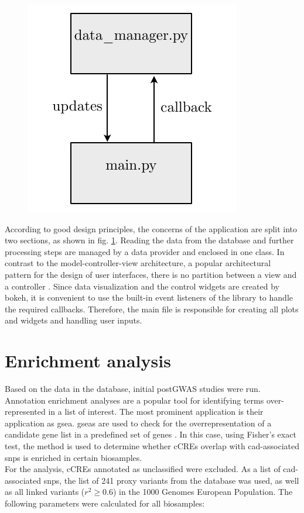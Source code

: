     \begin{figure}[h]
    \capstart
        \centering
    	\includegraphics{Abbildung/vis_architecture.pdf}

    	\begin{minipage}{\captionwidth}
    		\caption[vis archi]{}
    		\label{fig:plot_architecture}
    	\end{minipage}
    \end{figure}

According to good design principles, the concerns of the application are split into two sections, as shown in fig. \ref{fig:plot_architecture}. Reading the data from the database and further processing steps are managed by a data provider and enclosed in one class. In contrast to the model-controller-view architecture, a popular architectural pattern for the design of user interfaces, there is no partition between a view and a controller \cite{langtangenUsingWebFrameworks2015}. Since data visualization and the control widgets are created by bokeh, it is convenient to use the built-in event listeners of the library to handle the required callbacks. Therefore, the main file is responsible for creating all plots and widgets and handling user inputs.

\section{Enrichment analysis}
\label{sec:enrichment}
Based on the data in the database, initial postGWAS studies were run. Annotation enrichment analyses are a popular tool for identifying terms over-represented in a list of interest. The most prominent application is their application as \ac{gsea}. \Acp{gsea} are used to check for the overrepresentation of a candidate gene list in a predefined set of genes \cite{tipneyIntroductionEffectiveUse2010}. In this case, using Fisher's exact test, the method is used to determine whether \acp{cCRE} overlap with \ac{cad}-associated \acp{snp} is enriched in certain biosamples.\\
For the analysis, \acp{cCRE} annotated as unclassified were excluded. As a list of \ac{cad}-associated \acp{snp}, the list of 241 proxy variants from the database was used, as well as all linked variants ($r^2\geq0.6$) in the 1000 Genomes European Population. The following parameters were calculated for all biosamples:

